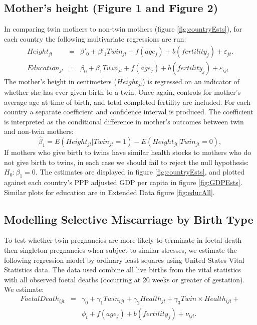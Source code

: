 \documentclass{nature}
\begin{document}
\begin{linenumbers}
\subsection{Mother's height (Figure 1 and Figure 2)}
In comparing twin mothers to non-twin mothers (figure \ref{fig:countryEsts}), for each country the following multivariate regressions are run:
\begin{eqnarray}
  Height_{jt}&=&\beta'_0 + \beta'_1 Twin_{jt} + f(age_j) + b(fertility_j) + \varepsilon_{jt}.\\
  Education_{jt}&=&\beta_0 + \beta_1 Twin_{jt} + f(age_j) + b(fertility_j) + \varepsilon_{ijt} 
\end{eqnarray}
The mother's height in centimeters ($Height_{jt}$) is regressed on an indicator of whether she has ever given birth to a twin.  Once again, controls for mother's average age at time of birth, and total completed fertility are included.  For each country a separate coefficient and confidence interval is produced.  The coefficient is interpreted as the conditional difference in mother's outcomes between twin and non-twin mothers:
\[
\hat\beta_1 = E(Height_{jt}| Twin_{jt}=1) - E(Height_{jt}| Twin_{jt}=0),
\]
If mothers who give birth to twins have similar health stocks to mothers who do not give birth to twins, in each case we should fail to reject the null hypothesis: $H_0: \beta_1=0$.  The estimates are displayed in figure \ref{fig:countryEsts}, and plotted against each country's PPP adjusted GDP per capita in figure \ref{fig:GDPEsts}.  Similar plots for education are in Extended Data figure \ref{fig:educAll}.

\subsection{Modelling Selective Miscarriage by Birth Type}
To test whether twin  pregnancies are more likely to terminate in foetal death then singleton pregnancies when subject to similar stresses, we estimate the following regression model by ordinary least squares using United States Vital Statistics data.  The data used combine all live births from the vital statistics with all observed foetal deaths (occurring at 20 weeks or greater of gestation).  We estimate:
\begin{eqnarray}
  FoetalDeath_{ijt} &=& \gamma_0 + \gamma_1 Twin_{ijt} + \gamma_2 Health_{jt} + \gamma_3 Twin\times Health_{ijt} + \nonumber \\ && \phi_t + f(age_j) + b(fertility_j) + \nu_{ijt}.
\end{eqnarray}


\end{linenumbers}
\end{document}
